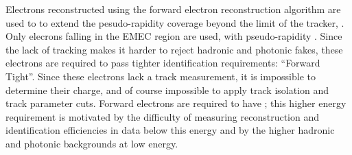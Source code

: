 Electrons reconstructed using the forward electron reconstruction algorithm are
used to to extend the pesudo-rapidity coverage beyond the limit of the tracker,
. Only elecrons falling in the EMEC region are used, with
pseudo-rapidity .  Since the lack of tracking makes it
harder to reject hadronic and photonic fakes, these electrons are required to
pass tighter identification requirements: ``Forward Tight''. Since these
electrons lack a track measurement, it is impossible to determine their charge,
and of course impossible to apply track isolation and track parameter cuts.
Forward electrons are required to have ; this higher energy requirement
is motivated by the difficulty of measuring reconstruction and identification
efficiencies in data below this energy and by the higher hadronic and photonic
backgrounds at low energy.

